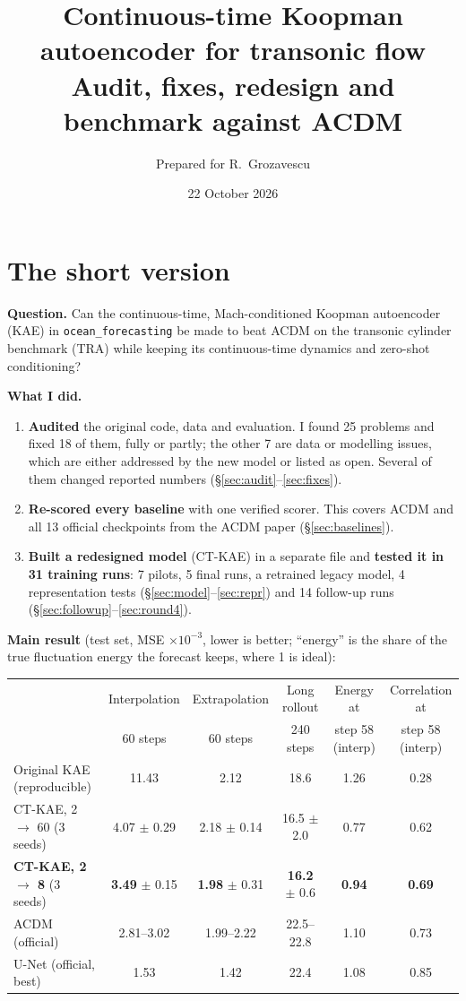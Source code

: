 \documentclass[10.5pt,a4paper]{article}
\title{\textbf{Continuous-time Koopman autoencoder for transonic flow}\\[2pt]
\large Audit, fixes, redesign and benchmark against ACDM}
\author{Prepared for R.~Grozavescu}
\date{22 October 2026}
\begin{document}
\maketitle

\section*{The short version}

\textbf{Question.} Can the continuous-time, Mach-conditioned Koopman autoencoder (KAE) in
\texttt{ocean\_forecasting} be made to beat ACDM on the transonic cylinder benchmark (TRA)
while keeping its continuous-time dynamics and zero-shot conditioning?

\textbf{What I did.}
\begin{enumerate}
\item \textbf{Audited} the original code, data and evaluation. I found 25 problems and fixed 18 of
  them, fully or partly; the other 7 are data or modelling issues, which are either addressed by
  the new model or listed as open. Several of them changed reported numbers (\S\ref{sec:audit}--\ref{sec:fixes}).
\item \textbf{Re-scored every baseline} with one verified scorer. This covers ACDM and all 13
  official checkpoints from the ACDM paper (\S\ref{sec:baselines}).
\item \textbf{Built a redesigned model} (CT-KAE) in a separate file and \textbf{tested it in
  31 training runs}: 7 pilots, 5 final runs, a retrained legacy model, 4 representation
  tests (\S\ref{sec:model}--\ref{sec:repr}) and 14 follow-up runs (\S\ref{sec:followup}--\ref{sec:round4}).
\end{enumerate}

\textbf{Main result} (test set, MSE $\times10^{-3}$, lower is better; ``energy'' is the share of
the true fluctuation energy the forecast keeps, where 1 is ideal):

\begin{center}\small
\begin{tabular}{lccccc}
\toprule
 & Interpolation & Extrapolation & Long rollout & Energy at & Correlation at\\
 & 60 steps & 60 steps & 240 steps & step 58 (interp) & step 58 (interp)\\
\midrule
Original KAE (reproducible) & 11.43 & 2.12 & 18.6 & 1.26 & 0.28\\
CT-KAE, 2 $\to$ 60 (3 seeds) & 4.07 $\pm$ 0.29 & 2.18 $\pm$ 0.14 & 16.5 $\pm$ 2.0 & 0.77 & 0.62\\
\textbf{CT-KAE, 2 $\to$ 8} (3 seeds) & \textbf{3.49} $\pm$ 0.15 & \textbf{1.98} $\pm$ 0.31 & \textbf{16.2} $\pm$ 0.6 & \textbf{0.94} & \textbf{0.69}\\
ACDM (official)                  & 2.81--3.02 & 1.99--2.22 & 22.5--22.8 & 1.10 & 0.73\\
U-Net (official, best) & 1.53 & 1.42 & 22.4 & 1.08 & 0.85\\
\bottomrule
\end{tabular}
\end{center}
\end{document}
